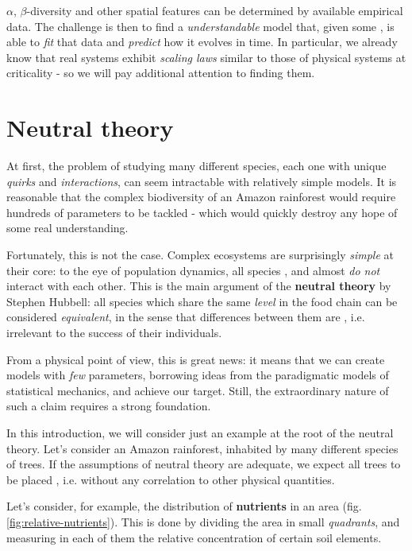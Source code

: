 \documentclass[../../main.tex]{subfiles}
\begin{document}
$\alpha$, $\beta$-diversity and other spatial features can be determined by available empirical data. The challenge is then to find a \textit{understandable} model that, given some , is able to \textit{fit} that data and \textit{predict} how it evolves in time. In particular, we already know that real systems exhibit \textit{scaling laws} similar to those of physical systems at criticality - so we will pay additional attention to finding them.


\section{Neutral theory}
At first, the problem of studying many different species, each one with unique \textit{quirks} and \textit{interactions}, can seem intractable with relatively simple models. It is reasonable that the complex biodiversity of an Amazon rainforest would require hundreds of parameters to be tackled - which would quickly destroy any hope of some real understanding.

\medskip

Fortunately, this is not the case. Complex ecosystems are surprisingly \textit{simple} at their core: to the eye of population dynamics, all species , and almost \textit{do not} interact with each other. This is the main argument of the \textbf{neutral theory} by Stephen Hubbell: all species which share the same \textit{level} in the food chain can be considered \textit{equivalent}, in the sense that differences between them are , i.e. irrelevant to the success of their individuals. 

\medskip

From a physical point of view, this is great news: it means that we can create models with \textit{few} parameters, borrowing ideas from the paradigmatic models of statistical mechanics, and achieve our target. Still, the extraordinary nature of such a claim requires a strong foundation.

\medskip

In this introduction, we will consider just an example at the root of the neutral theory. Let's consider an Amazon rainforest, inhabited by many different species of trees. If the assumptions of neutral theory are adequate, we expect all trees to be placed , i.e. without any correlation to other physical quantities. 

Let's consider, for example, the distribution of \textbf{nutrients} in an area (fig. \ref{fig:relative-nutrients}). This is done by dividing the area in small \textit{quadrants}, and measuring in each of them the relative concentration of certain soil elements.
\end{document}

